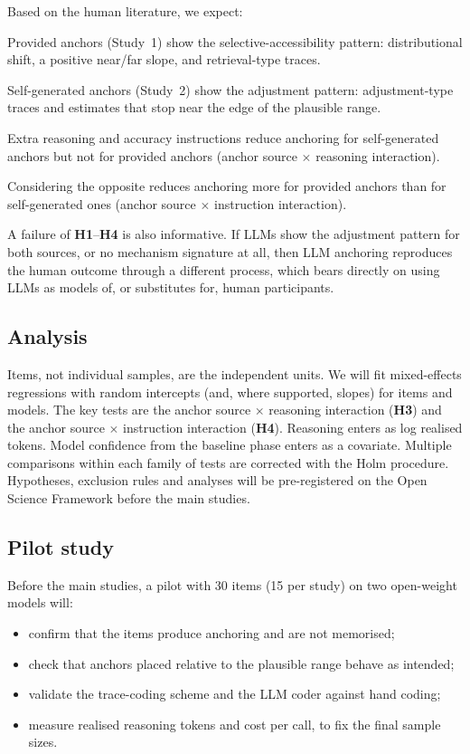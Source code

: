 \documentclass[11pt,a4paper]{article}
\newcommand{\Hyp}[1]{\textbf{H#1}}
\begin{document}
Based on the human literature, we expect:
\begin{description}[leftmargin=1.2cm,labelwidth=1cm]
  \item[\Hyp{1}] Provided anchors (Study~1) show the selective-accessibility pattern: distributional shift, a positive near/far slope, and retrieval-type traces.
  \item[\Hyp{2}] Self-generated anchors (Study~2) show the adjustment pattern: adjustment-type traces and estimates that stop near the edge of the plausible range.
  \item[\Hyp{3}] Extra reasoning and accuracy instructions reduce anchoring for self-generated anchors but not for provided anchors (anchor source $\times$ reasoning interaction).
  \item[\Hyp{4}] Considering the opposite reduces anchoring more for provided anchors than for self-generated ones (anchor source $\times$ instruction interaction).
\end{description}
A failure of \Hyp{1}--\Hyp{4} is also informative. If LLMs show the adjustment pattern for both sources, or no mechanism signature at all, then LLM anchoring reproduces the human outcome through a different process, which bears directly on using LLMs as models of, or substitutes for, human participants.

\subsection{Analysis}

Items, not individual samples, are the independent units. We will fit mixed-effects regressions with random intercepts (and, where supported, slopes) for items and models. The key tests are the anchor source $\times$ reasoning interaction (\Hyp{3}) and the anchor source $\times$ instruction interaction (\Hyp{4}). Reasoning enters as log realised tokens. Model confidence from the baseline phase enters as a covariate. Multiple comparisons within each family of tests are corrected with the Holm procedure. Hypotheses, exclusion rules and analyses will be pre-registered on the Open Science Framework before the main studies.

\subsection{Pilot study}

Before the main studies, a pilot with 30 items (15 per study) on two open-weight models will:
\begin{itemize}
  \item confirm that the items produce anchoring and are not memorised;
  \item check that anchors placed relative to the plausible range behave as intended;
  \item validate the trace-coding scheme and the LLM coder against hand coding;
  \item measure realised reasoning tokens and cost per call, to fix the final sample sizes.
\end{itemize}
\end{document}
